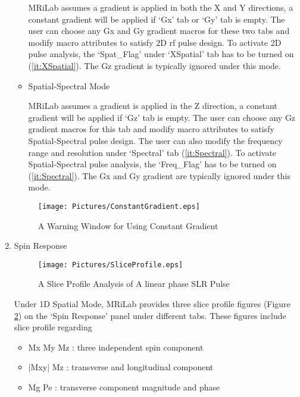 \documentclass{book}%
\begin{document}
\begin{enumerate}
\begin{itemize}
MRiLab assumes a gradient is applied in both the X and Y directions, a constant gradient will be applied if `Gx' tab or `Gy' tab is empty. The user can choose any Gx and Gy gradient macros for these two tabs and modify macro attributes to satisfy 2D rf pulse design. To activate 2D pulse analysis, the `Spat\_Flag' under `XSpatial' tab has to be turned on (\ref{it:XSpatial}). The Gz gradient is typically ignored under this mode.

	\item Spatial-Spectral Mode
	
MRiLab assumes a gradient is applied in the Z direction, a constant gradient will be applied if `Gz' tab is empty. The user can choose any Gz gradient macros for this tab and modify macro attributes to satisfy Spatial-Spectral pulse design. The user can also modify the frequency range and resolution under `Spectral' tab (\ref{it:Spectral}). To activate Spatial-Spectral pulse analysis, the `Freq\_Flag' has to be turned on (\ref{it:Spectral}). The Gx and Gy gradient are typically ignored under this mode.

\end{itemize}

	\begin{figure}[htbp]
	\centering
		\texttt{[image: Pictures/ConstantGradient.eps]}
	\caption{A Warning Window for Using Constant Gradient}
	\label{fig:ConstantGradient}
\end{figure}

	\item Spin Response \\

\begin{figure}[htbp]
	\centering
		\texttt{[image: Pictures/SliceProfile.eps]}
	\caption{A Slice Profile Analysis of A linear phase SLR Pulse}
	\label{fig:SliceProfile}
\end{figure}

Under 1D Spatial Mode, MRiLab provides three slice profile figures (Figure \ref{fig:SliceProfile}) on the `Spin Response' panel under different tabs. These figures include slice profile regarding 

\begin{itemize}
	\item Mx My Mz : three independent spin component
	\item $\vert$Mxy$\vert$ Mz : transverse and longitudinal component
	\item Mg Pe : transverse component magnitude and phase
\end{itemize}


\end{enumerate}
\end{document}
